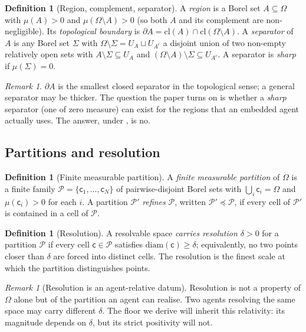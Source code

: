 \documentclass[11pt,a4paper]{article}
\theoremstyle{thmstyle}
\theoremstyle{definition}
\newtheorem{definition}[theorem]{Definition}
\theoremstyle{remark}
\newtheorem{remark}[theorem]{Remark}
\newcommand{\Space}{\Omega}
\newcommand{\Bdy}{\partial}
\newcommand{\cl}{\mathrm{cl}}
\newcommand{\diam}{\mathrm{diam}}
\newcommand{\reso}{\delta}
\newcommand{\Part}{\mathscr{P}}
\newcommand{\cell}{\mathsf{c}}
\begin{document}
\begin{definition}[Region, complement, separator]
\label{def:region}
A \emph{region} is a Borel set $A\subseteq\Space$ with
$\mu(A)>0$ and $\mu(\Space\setminus A)>0$ (so both $A$ and its complement are
non-negligible). Its \emph{topological boundary} is
$\Bdy A=\cl(A)\cap\cl(\Space\setminus A)$. A \emph{separator} of $A$ is any
Borel set $\Sigma$ with $\Space\setminus\Sigma=U_A\sqcup U_{A^c}$ a disjoint
union of two non-empty relatively open sets with $A\setminus\Sigma\subseteq
U_A$ and $(\Space\setminus A)\setminus\Sigma\subseteq U_{A^c}$. A separator is
\emph{sharp} if $\mu(\Sigma)=0$.
\end{definition}

\begin{remark}
$\Bdy A$ is the smallest closed separator in the topological sense; a general
separator may be thicker. The question the paper turns on is whether a
\emph{sharp} separator (one of zero measure) can exist for the regions that an
embedded agent actually uses. The answer, under , is no.
\end{remark}

\subsection{Partitions and resolution}

\begin{definition}[Finite measurable partition]
\label{def:partition}
A \emph{finite measurable partition} of $\Space$ is a finite family
$\Part=\{\cell_1,\dots,\cell_N\}$ of pairwise-disjoint Borel sets with
$\bigcup_i\cell_i=\Space$ and $\mu(\cell_i)>0$ for each $i$. A partition
$\Part'$ \emph{refines} $\Part$, written $\Part'\preceq\Part$, if every cell of
$\Part'$ is contained in a cell of $\Part$.
\end{definition}

\begin{definition}[Resolution]
\label{def:resolution}
A resolvable space \emph{carries resolution $\reso>0$} for a partition $\Part$
if every cell $\cell\in\Part$ satisfies $\diam(\cell)\ge\reso$; equivalently, no
two points closer than $\reso$ are forced into distinct cells. The resolution
is the finest scale at which the partition distinguishes points.
\end{definition}

\begin{remark}[Resolution is an agent-relative datum]
\label{rem:reso-relative}
Resolution is not a property of $\Space$ alone but of the partition an agent can
realise. Two agents resolving the same space may carry different $\reso$. The
floor we derive will inherit this relativity: its magnitude depends on $\reso$,
but its strict positivity will not.
\end{remark}
\end{document}

